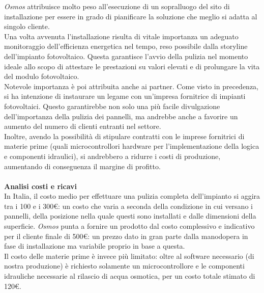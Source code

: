 \documentclass[a4paper, 12pt]{article}
\begin{document}
	\emph{Osmos} attribuisce molto peso all'esecuzione di un sopralluogo del sito di installazione per essere in grado di pianificare la soluzione che meglio si adatta al singolo cliente.\\
	Una volta avvenuta l'installazione risulta di vitale importanza un adeguato monitoraggio dell'efficienza energetica nel tempo, reso possibile dalla storyline dell'impianto fotovoltaico. Questa garantisce l'avvio della pulizia nel momento ideale allo scopo di attestare le prestazioni su valori elevati e di prolungare la vita del modulo fotovoltaico.\\
	Notevole importanza è poi attribuita anche ai partner. Come visto in precedenza, si ha intenzione di instaurare un legame con un'impresa fornitrice di impianti fotovoltaici. Questo garantirebbe non solo una più facile divulgazione dell'importanza della pulizia dei pannelli, ma andrebbe anche a favorire un aumento del numero di clienti entranti nel settore.\\
	Inoltre, avendo la possibilità di stipulare contratti con le imprese fornitrici di materie prime (quali microcontrollori hardware per l'implementazione della logica e componenti idraulici), si andrebbero a ridurre i costi di produzione, aumentando di conseguenza il margine di profitto.\\\\
	\textbf{Analisi costi e ricavi}\\
	In Italia, il costo medio per effettuare una pulizia completa dell'impianto si aggira tra i 100 e i 300\euro: un costo che varia a seconda della condizione in cui versano i pannelli, della posizione nella quale questi sono installati e dalle dimensioni della superficie. \emph{Osmos} punta a fornire un prodotto dal costo complessivo e indicativo per il cliente finale di 500\euro: un prezzo dato in gran parte dalla manodopera in fase di installazione ma variabile proprio in base a questa.\\
	Il costo delle materie prime è invece più limitato: oltre al software necessario (di nostra produzione) è richiesto solamente un microcontrollore e le componenti idrauliche necessarie al rilascio di acqua osmotica, per un costo totale stimato di 120\euro.\\
\end{document}
